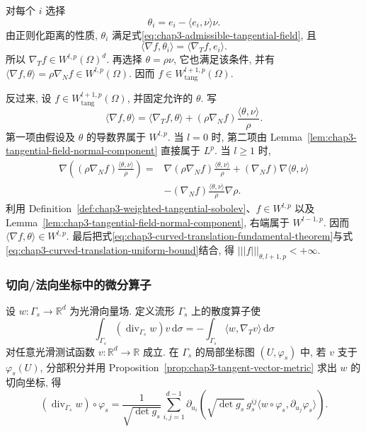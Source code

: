 \begin{Proof}
对每个 $i$ 选择
\[
 \theta_i=e_i-\langle e_i,\nu\rangle\nu.
\]
由正则化距离的性质, $\theta_i$ 满足式\eqref{eq:chap3-admissible-tangential-field}, 且
\[
 \langle\nabla f,\theta_i\rangle
 =\langle\nabla_Tf,e_i\rangle.
\]
所以 $\nabla_Tf\in W^{l,p}(\Omega)^d$. 再选择 $\theta=\rho\nu$, 它也满足该条件, 并有 $\langle\nabla f,\theta\rangle=\rho\nabla_Nf\in W^{l,p}(\Omega)$. 因而 $f\in W_{\mathrm{tang}}^{l+1,p}(\Omega)$.

反过来, 设 $f\in W_{\mathrm{tang}}^{l+1,p}(\Omega)$, 并固定允许的 $\theta$. 写
\[
 \langle\nabla f,\theta\rangle
 =\langle\nabla_Tf,\theta\rangle
 +(\rho\nabla_Nf)\frac{\langle\theta,\nu\rangle}{\rho}.
\]
第一项由假设及 $\theta$ 的导数界属于 $W^{l,p}$. 当 $l=0$ 时, 第二项由 Lemma~\ref{lem:chap3-tangential-field-normal-component} 直接属于 $L^p$. 当 $l\geq1$ 时,
\begin{align*}
 \nabla\left((\rho\nabla_Nf)\frac{\langle\theta,\nu\rangle}{\rho}\right)
 ={}&\nabla(\rho\nabla_Nf)\frac{\langle\theta,\nu\rangle}{\rho}
 +(\nabla_Nf)\nabla\langle\theta,\nu\rangle\\
 &-(\nabla_Nf)\frac{\langle\theta,\nu\rangle}{\rho}\nabla\rho.
\end{align*}
利用 Definition~\ref{def:chap3-weighted-tangential-sobolev}、$f\in W^{l,p}$ 以及 Lemma~\ref{lem:chap3-tangential-field-normal-component}, 右端属于 $W^{l-1,p}$. 因而 $\langle\nabla f,\theta\rangle\in W^{l,p}$. 最后把式\eqref{eq:chap3-curved-translation-fundamental-theorem}与式\eqref{eq:chap3-curved-translation-uniform-bound}结合, 得 $|||f|||_{\theta,l+1,p}<+\infty$.
\end{Proof}

\subsubsection{切向/法向坐标中的微分算子}
\label{subsec:chap3-tangential-normal-operators}

设 $w:\Gamma_s\to\mathbb R^d$ 为光滑向量场. 定义流形 $\Gamma_s$ 上的散度算子使
\[
 \int_{\Gamma_s}(\operatorname{div}_{\Gamma_s}w)v\,\mathrm d\sigma
 =-\int_{\Gamma_s}\langle w,\nabla_Tv\rangle\,\mathrm d\sigma
\]
对任意光滑测试函数 $v:\mathbb R^d\to\mathbb R$ 成立. 在 $\Gamma_s$ 的局部坐标图 $(U,\varphi_s)$ 中, 若 $v$ 支于 $\varphi_s(U)$, 分部积分并用 Proposition~\ref{prop:chap3-tangent-vector-metric} 求出 $w$ 的切向坐标, 得
\begin{equation}
 (\operatorname{div}_{\Gamma_s}w)\circ\varphi_s
 =\frac1{\sqrt{\det g_s}}\sum_{i,j=1}^{d-1}
 \partial_{u_i}\left(\sqrt{\det g_s}\,g_s^{ij}
 \langle w\circ\varphi_s,\partial_{u_j}\varphi_s\rangle\right).
 \label{eq:chap3-surface-divergence-local}
\end{equation}

